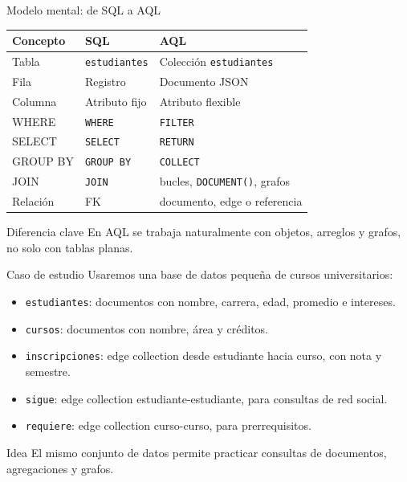\documentclass[aspectratio=169,11pt]{beamer}
\begin{document}
\begin{frame}{Modelo mental: de SQL a AQL}
\begin{table}
\centering
\small
\begin{tabular}{lll}
\toprule
Concepto & SQL & AQL \\
\midrule
Tabla & \texttt{estudiantes} & Colección \texttt{estudiantes} \\
Fila & Registro & Documento JSON \\
Columna & Atributo fijo & Atributo flexible \\
WHERE & \texttt{WHERE} & \texttt{FILTER} \\
SELECT & \texttt{SELECT} & \texttt{RETURN} \\
GROUP BY & \texttt{GROUP BY} & \texttt{COLLECT} \\
JOIN & \texttt{JOIN} & bucles, \texttt{DOCUMENT()}, grafos \\
Relación & FK & documento, edge o referencia \\
\bottomrule
\end{tabular}
\end{table}

\vspace{0.3cm}
\begin{alertblock}{Diferencia clave}
En AQL se trabaja naturalmente con objetos, arreglos y grafos, no solo con tablas planas.
\end{alertblock}
\end{frame}

\begin{frame}{Caso de estudio}
Usaremos una base de datos pequeña de cursos universitarios:

\vspace{0.2cm}
\begin{itemize}
  \item \texttt{estudiantes}: documentos con nombre, carrera, edad, promedio e intereses.
  \item \texttt{cursos}: documentos con nombre, área y créditos.
  \item \texttt{inscripciones}: edge collection desde estudiante hacia curso, con nota y semestre.
  \item \texttt{sigue}: edge collection estudiante-estudiante, para consultas de red social.
  \item \texttt{requiere}: edge collection curso-curso, para prerrequisitos.
\end{itemize}

\vspace{0.2cm}
\begin{block}{Idea}
El mismo conjunto de datos permite practicar consultas de documentos, agregaciones y grafos.
\end{block}
\end{frame}
\end{document}
